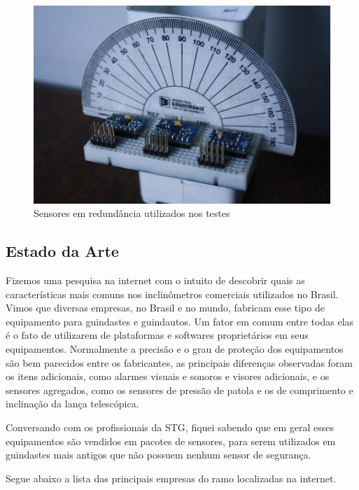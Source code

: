 \documentclass[a4paper,12pt]{article}
\begin{document}
\begin{figure}[H]
\centering
\includegraphics[width=.5\textwidth]{img/sensores.jpg}
\caption{Sensores em redundância utilizados nos testes}
\end{figure}


\subsection{Estado da Arte}

Fizemos uma pesquisa na internet com o intuito de descobrir quais as características mais comuns nos inclinômetros comerciais utilizados no Brasil. Vimos que diversas empresas, no Brasil e no mundo, fabricam esse tipo de equipamento para guindastes e guindautos. Um fator em comum entre todas elas é o fato de utilizarem de plataformas e softwares proprietários em seus equipamentos. Normalmente a precisão e o grau de proteção dos equipamentos são bem parecidos entre os fabricantes, as principais diferenças observadas foram os itens adicionais, como alarmes visuais e sonoros e visores adicionais, e os sensores agregados, como os sensores de pressão de patola e os de comprimento e inclinação da lança telescópica.

Conversando com os profissionais da STG, fiquei sabendo que em geral esses equipamentos são vendidos em pacotes de sensores, para serem utilizados em guindastes mais antigos que não possuem nenhum sensor de segurança.

Segue abaixo a lista das principais empresas do ramo localizadas na internet.
\end{document}
